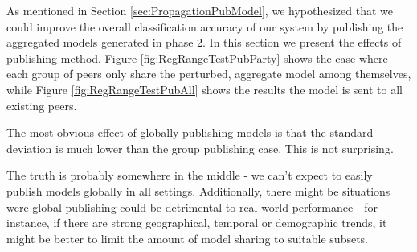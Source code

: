 As mentioned in Section \ref{sec:PropagationPubModel}, we hypothesized that we could improve the overall classification accuracy of our system by publishing the aggregated models generated in phase 2. In this section we present the effects of publishing method. Figure \ref{fig:RegRangeTestPubParty} shows the case where each group of peers only share the perturbed, aggregate model among themselves, while Figure \ref{fig:RegRangeTestPubAll} shows the results the model is sent to all existing peers. 

The most obvious effect of globally publishing models is that the standard deviation is much lower than the group publishing case. This is not surprising.

The truth is probably somewhere in the middle - we can't expect to easily publish models globally in all settings. Additionally, there might be situations were global publishing could be detrimental to real world performance - for instance, if there are strong geographical, temporal or demographic trends, it might be better to limit the amount of model sharing to suitable subsets.

